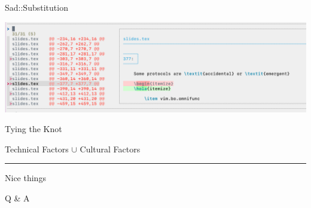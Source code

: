 \documentclass{beamer}
\begin{document}
\begin{frame}{Sad::Substitution}

	\includegraphics[width=\textwidth]{sad}

\end{frame}


\begin{frame}{Tying the Knot}

	\begin{centering}

		{\Large Technical Factors $\cup$ Cultural Factors}

		\rule{\textwidth}{0.1em}

		{\LARGE Nice things}

	\end{centering}

\end{frame}


\begin{frame}[standout]

	Q \& A

\end{frame}
\end{document}
